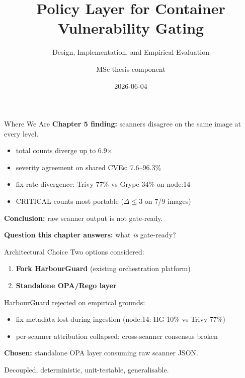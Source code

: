 \documentclass[aspectratio=169]{beamer}
\title{Policy Layer for Container Vulnerability Gating}
\subtitle{Design, Implementation, and Empirical Evaluation}
\author{MSc thesis component}
\date{2026-06-04}
\begin{document}
\maketitle

\begin{frame}{Where We Are}
\textbf{Chapter 5 finding:} scanners disagree on the same image at every level.

\medskip
\begin{itemize}
  \item total counts diverge up to 6.9$\times$
  \item severity agreement on shared CVEs: 7.6--96.3\%
  \item fix-rate divergence: Trivy 77\% vs Grype 34\% on node:14
  \item CRITICAL counts most portable ($\Delta \leq 3$ on 7/9 images)
\end{itemize}

\medskip
\textbf{Conclusion:} raw scanner output is not gate-ready.

\medskip
\textbf{Question this chapter answers:} what \emph{is} gate-ready?
\end{frame}

\begin{frame}{Architectural Choice}
Two options considered:

\medskip
\begin{enumerate}
  \item \textbf{Fork HarbourGuard} (existing orchestration platform)
  \item \textbf{Standalone OPA/Rego layer}
\end{enumerate}

\medskip
HarbourGuard rejected on empirical grounds:
\begin{itemize}
  \item fix metadata lost during ingestion (node:14: HG 10\% vs Trivy 77\%)
  \item per-scanner attribution collapsed; cross-scanner consensus broken
\end{itemize}

\medskip
\textbf{Chosen:} standalone OPA layer consuming raw scanner JSON.

Decoupled, deterministic, unit-testable, generalisable.
\end{frame}
\end{document}
